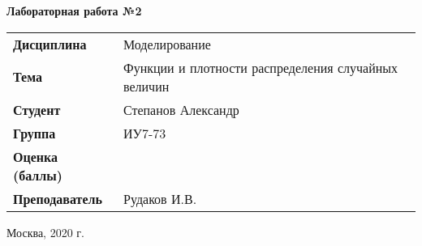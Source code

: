 \begin{center}
    \textbf{Лабораторная работа №2} \\
    \vspace{0.5cm}
\end{center}

\vspace{4cm}

\begin{flushleft}
    \begin{tabular}{ll}
        \textbf{Дисциплина} & Моделирование \\
        \textbf{Тема} & Функции и плотности распределения случайных величин\\
        \textbf{Студент} & Степанов Александр \\
        \textbf{Группа} & ИУ7-73 \\
        \textbf{Оценка (баллы)} & \\
        \textbf{Преподаватель} & Рудаков И.В. \\
    \end{tabular}
\end{flushleft}

\vspace{4cm}

\begin{center}
    Москва, 2020 г.
\end{center}
